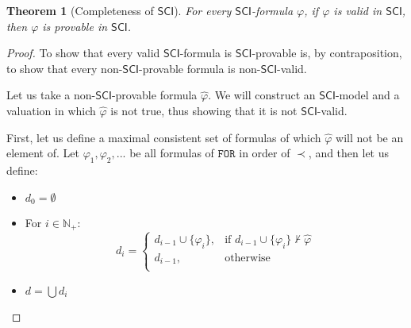 \documentclass{article}
\newtheorem{theorem}{Theorem}
\theoremstyle{definition}
\theoremstyle{definition}
\theoremstyle{definition}
\theoremstyle{definition}
\theoremstyle{definition}
\newcommand*{\FOR}{\texttt{FOR}}
\newcommand{\SCI}{$\mathsf{SCI}$\xspace}
\newcommand{\N}{\mathbb{N}}
\begin{document}
\begin{theorem}[Completeness of \SCI]
    For every \SCI-formula $\varphi$, if $\varphi$ is valid in \SCI, then $\varphi$ is provable in \SCI.
\end{theorem}
\begin{proof}
    To show that every valid \SCI-formula is \SCI-provable is, by contraposition, to show that every non-\SCI-provable formula is non-\SCI-valid.

    Let us take a non-\SCI-provable formula $\hat{\varphi}$. We will construct an
    \SCI-model and a valuation in which $\hat{\varphi}$ is not true, thus showing
    that it is not \SCI-valid.

    First, let us define a maximal consistent set of formulas of which
    $\hat{\varphi}$ will not be an element of. Let $\varphi_1, \varphi_2, ...$ be
    all formulas of $\FOR$ in order of $\prec$, and then let us define:

    \begin{itemize}
        \item $d_0 = \emptyset$
        \item For $i \in \N_+$: $$ d_{i} = \begin{cases}
                      d_{i-1} \cup \{\varphi_i\}, & \text{if } d_{i-1} \cup \{\varphi_i\} \not \vdash \hat{\varphi} \\
                      d_{i-1},                    & \text{otherwise}                                                \\
                  \end{cases}
              $$
        \item $d = \bigcup d_i$
    \end{itemize}


\end{proof}
\end{document}
